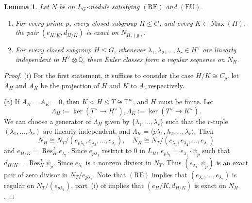 \documentclass[10pt,a4paper]{amsart}
\newtheorem{lemma}{Lemma}
\newcommand{\Max}{\operatorname{Max}}
\newcommand{\bbT}{\mathbb T}
\begin{document}
\begin{lemma}\label{lem:compact exactness condition}
Let $N$ be an $L_G$-module satisfying $(\mathrm{RE})$ and $(\mathrm{EU})$. 
\begin{enumerate}[label=\textup{(\roman*)},leftmargin=3em]
  \item For every prime $p$, every closed subgroup $H\leq G$, and every $K\in\Max(H)$, the pair $(e_{H/K},d_{H/K})$ is exact on $N_{H,(p)}$. 
  \item For every closed subgroup $H\leq G$, whenever $\lambda_1,\lambda_2, \dots, \lambda_r\in H^\vee$ are linearly independent in $H^\vee\otimes \mathbb Q$, there Euler classes form a regular sequence on $N_H$.
\end{enumerate}
\end{lemma}

\begin{proof}
  (i) For the first statement, it suffices to consider the case $H/K\cong C_p$. let $A_H$ and $A_K$ be the projection of $H$ and $K$ to $A$, respectively. 
  
  (a) If $A_H=A_K=0$, then $K< H\leq T\cong \bbT^m$, and $H$ must be finite. Let 
  \[
  \Lambda_H:=\ker (T^\vee \to H^\vee), \Lambda_K:=\ker ( T^\vee\to K^\vee).
  \]
  We can choose a generator of $\Lambda_H$ given by $\{\lambda_1,\dots, \lambda_r\}$ such that the $r$-tuple $(\lambda_1,\dots,\lambda_r)$ are linearly independent, and $\Lambda_K=\langle p\lambda_1,\lambda_2,\dots, \lambda_r\rangle$. Then
  \[
  N_H \cong N_T/(e_{p\lambda_1},e_{\lambda_2}, \dots, e_{\lambda_r}),\quad N_K \cong N_T/(e_{\lambda_1},e_{\lambda_2}, \dots, e_{\lambda_r})
  \]
  and $e_{H/K}=\operatorname{Res}_H^T e_{\lambda_1}$. Since $e_{p\lambda_1}$ restrict to $0$ in $L_H$, $e_{p\lambda_1}=e_{\lambda_1}\cdot \psi_p$ such that $d_{H/K}=\operatorname{Res}_H^T \psi_p$. Since $e_{\lambda_1}$ is a nonzero divisor in $N_T$. Thus $(e_{\lambda_1}, \psi_p)$ is an exact pair of zero divisor in $N_T/e_{p\lambda_1}$. Note that $(\mathrm{RE})$ implies that $(e_{\lambda_2},\dots, e_{\lambda_r})$ is regular on $N_T/(e_{p\lambda_1})$, part~\textup{(i)} of  implies that $(e_H/K,d_{H/K})$ is exact on $N_H$. 


\end{proof}
\end{document}
